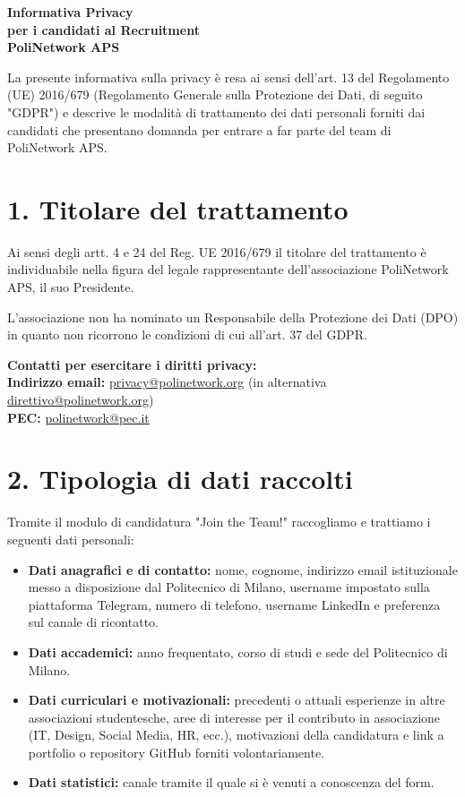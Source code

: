 \documentclass[11pt, a4paper]{article}
\begin{document}
\begin{center}
    \textbf{\Huge\color{PoliBlue} Informativa Privacy} \\[0.3cm]
    \textbf{\Large per i candidati al Recruitment} \\[0.4cm]
    \textbf{\large PoliNetwork APS}
\end{center}

\vspace{0.5cm}

La presente informativa sulla privacy è resa ai sensi dell'art. 13 del Regolamento (UE) 2016/679 (Regolamento Generale sulla Protezione dei Dati, di seguito "GDPR") e descrive le modalità di trattamento dei dati personali forniti dai candidati che presentano domanda per entrare a far parte del team di PoliNetwork APS.

\section*{1. Titolare del trattamento}

Ai sensi degli artt. 4 e 24 del Reg. UE 2016/679 il titolare del trattamento è individuabile nella figura del legale rappresentante dell'associazione PoliNetwork APS, il suo Presidente.

L'associazione non ha nominato un Responsabile della Protezione dei Dati (DPO) in quanto non ricorrono le condizioni di cui all'art. 37 del GDPR.

\textbf{Contatti per esercitare i diritti privacy:} \\
\textbf{Indirizzo email:} \href{mailto:privacy@polinetwork.org}{privacy@polinetwork.org} (in alternativa \href{mailto:direttivo@polinetwork.org}{direttivo@polinetwork.org}) \\
\textbf{PEC:} \href{mailto:polinetwork@pec.it}{polinetwork@pec.it}

\section*{2. Tipologia di dati raccolti}

Tramite il modulo di candidatura "Join the Team!" raccogliamo e trattiamo i seguenti dati personali:
\begin{itemize}
    \item \textbf{Dati anagrafici e di contatto:} nome, cognome, indirizzo email istituzionale messo a disposizione dal Politecnico di Milano, username impostato sulla piattaforma Telegram, numero di telefono, username LinkedIn e preferenza sul canale di ricontatto.
    \item \textbf{Dati accademici:} anno frequentato, corso di studi e sede del Politecnico di Milano.
    \item \textbf{Dati curriculari e motivazionali:} precedenti o attuali esperienze in altre associazioni studentesche, aree di interesse per il contributo in associazione (IT, Design, Social Media, HR, ecc.), motivazioni della candidatura e link a portfolio o repository GitHub forniti volontariamente.
    \item \textbf{Dati statistici:} canale tramite il quale si è venuti a conoscenza del form.
\end{itemize}
\end{document}
